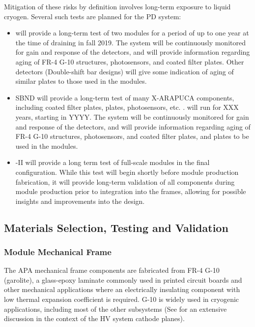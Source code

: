 Mitigation of these risks by definition involves long-term exposure to liquid cryogen.  Several such tests are planned for the PD system:

\begin{itemize}

    \item {} will provide a long-term test of two  modules for a period of up to one year at the time of draining in fall 2019.  The system will be continuously monitored for gain and response of the detectors, and will provide information regarding aging of FR-4 G-10 structures, photosensors, and coated filter plates.  Other  detectors (Double-shift bar designs) will give some indication of aging of similar  plates to those used in the  modules.

    \item SBND will provide a long-term test of many X-ARAPUCA components, including coated filter plates,  plates, photosensors, etc. .   will run for XXX years, starting in YYYY.  The system will be continuously monitored for gain and response of the detectors, and will provide information regarding aging of FR-4 G-10 structures, photosensors, and coated filter plates, and  plates to be used in the  modules.
    
    \item {}-II will provide a long term test of full-scale  modules in the final  configuration. While this test will begin shortly before   module production fabrication, it will provide long-term validation of all  components during module production prior to integration into the  frames, allowing for possible insights and improvements into the  design.

\end{itemize}


\subsection{Materials Selection, Testing and Validation}

\subsubsection{ Module Mechanical Frame}

The APA mechanical frame components are fabricated from FR-4 G-10 (garolite), a glass-epoxy laminate commonly used in printed circuit boards and other mechanical applications where an electrically insulating component with low thermal expansion coefficient is required.  G-10 is widely used in cryogenic applications, including most of the other  subsystems (See  for an extensive discussion in the context of the HV system cathode planes). 


